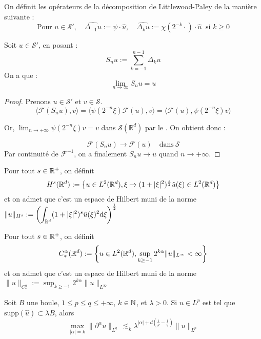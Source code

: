 \documentclass[11pt,a4paper]{article}
\begin{document}
\begin{defin}
On définit les opérateurs de la décomposition de Littlewood-Paley de la manière suivante :
\[
\text{Pour } u \in \mathcal{S}', \quad \widehat{\Delta_{-1} u} := \psi \cdot \hat{u}, \quad \widehat{\Delta_{k} u} := \chi(2^{-k} \cdot) \cdot \hat{u} \ \text{ si } k \geq 0
\]
\end{defin}

\begin{prop}
Soit $u \in \mathcal{S}'$, en posant :
\[ S_n u := \sum_{k=-1}^{n-1} \Delta_k u \]
On a que :
\[ \lim_{n \to \infty} S_n u = u \]
\end{prop}

\begin{proof}
Prenons $u \in \mathcal{S}'$ et $v \in \mathcal{S}$.
\[ \langle \mathcal{F}(S_n u), v \rangle = \langle \psi(2^{-n}\xi) \mathcal{F}(u), v \rangle = \langle \mathcal{F}(u), \psi(2^{-n}\xi) v \rangle \]

Or, $\lim_{n \to +\infty} \psi(2^{-n}\xi)v = v$ dans $\mathcal{S}(\mathbb{R}^d)$ par le . On obtient donc :

\[ \mathcal{F}(S_n u) \to \mathcal{F}(u) \quad \text{dans} \ \mathcal{S} \]
Par continuité de $\mathcal{F}^{-1}$, on a finalement $S_n u \to u$ quand $n \to +\infty$.
\end{proof}
     
     
\begin{defin}
Pour tout $s\in \mathbb R^+$, on définit 
\begin{equation*}
H^s(\mathbb R^d) := \left\{ u\in L^2(\mathbb R^d), \xi \mapsto (1+|\xi|^2)^{\frac{s}{2}}\hat{u}(\xi) \in L^2(\mathbb R^d) \right\}
\end{equation*}
et on admet que c'est un espace de Hilbert muni de la norme $\|u\|_{H^s} := \displaystyle \left(\int_{\mathbb R^d} (1+|\xi|^2)^s\hat{u}(\xi)^2\mathrm{d}\xi \right)^\frac{1}{2}$
\end{defin}


\begin{defin}
Pour tout $s\in \mathbb R^+$, on définit 
\begin{equation*}
C^\alpha_*(\mathbb R^d) := \left\{ u\in L^2(\mathbb R^d), \sup_{k \geq -1} 2^{k\alpha}\|u\|_{L^\infty} < \infty \right\}
\end{equation*}
et on admet que c'est un espace de Hilbert muni de la norme $\|u\|_{C^\alpha_*} :=  \sup_{k \geq -1} 2^{k\alpha}\|u\|_{L^\infty} $
\end{defin}

\begin{lemma}
Soit $B$ une boule, $1\leq p  \leq  q \leq +\infty$, $k\in \mathbb N$, et $\lambda >0$. Si $u\in L^p$ est tel que $\text{supp}(\hat{u})\subset \lambda B$, alors
\begin{equation}\label{bernstein}
\max_{|\alpha|=k}{\| \partial^\alpha u\|_{L^q}} \ \lesssim_k \lambda^{|\alpha| +d \left ( \frac{1}{p}- \frac{1}{q} \right )}\|u\|_{L^p}
\end{equation}
\end{lemma}
\end{document}
